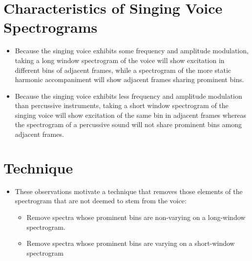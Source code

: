 \documentclass[72pt]{article}
\begin{document}
\begin{Huge}
\newpage

\section*{Characteristics of Singing Voice Spectrograms}
\begin{itemize}
    \item Because the singing voice exhibits some frequency and amplitude
    modulation, taking a long window spectrogram of the voice will show
    excitation in different bins of adjacent frames, while a spectrogram of the
    more static harmonic accompaniment will show adjacent frames sharing
    prominent bins.
\end{itemize}

\newpage


\begin{itemize}
    \item Because the singing voice exhibits less frequency and amplitude
    modulation than percussive instruments, taking a short window spectrogram of
    the singing voice will show excitation of the same bin in adjacent frames
    whereas the spectrogram of a percussive sound will not share prominent bins
    among adjacent frames.
\end{itemize}

\newpage


\section*{Technique}
\begin{itemize}
    \item These observations motivate a technique that removes those elements of
the spectrogram that are not deemed to stem from the voice:
    \begin{itemize}
        \item Remove spectra whose prominent bins are non-varying on a
long-window spectrogram.
        \item Remove spectra whose prominent bins are varying on a short-window
spectrogram
    \end{itemize}
\end{itemize}


\end{Huge}
\end{document}
